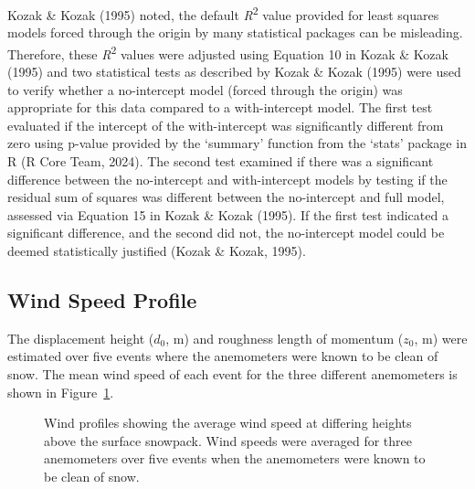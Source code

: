 \documentclass[
  letterpaper,
  DIV=11,
  numbers=noendperiod]{scrartcl}
\begin{document}
Kozak \& Kozak (1995) noted, the default \emph{R}\textsuperscript{2}
value provided for least squares models forced through the origin by
many statistical packages can be misleading. Therefore, these
\emph{R}\textsuperscript{2} values were adjusted using Equation 10 in
Kozak \& Kozak (1995) and two statistical tests as described by Kozak \&
Kozak (1995) were used to verify whether a no-intercept model (forced
through the origin) was appropriate for this data compared to a
with-intercept model. The first test evaluated if the intercept of the
with-intercept was significantly different from zero using p-value
provided by the `summary' function from the `stats' package in R (R Core
Team, 2024). The second test examined if there was a significant
difference between the no-intercept and with-intercept models by testing
if the residual sum of squares was different between the no-intercept
and full model, assessed via Equation 15 in Kozak \& Kozak (1995). If
the first test indicated a significant difference, and the second did
not, the no-intercept model could be deemed statistically justified
(Kozak \& Kozak, 1995).

\subsection{Wind Speed Profile}\label{wind-speed-profile}

The displacement height (\(d_0\), m) and roughness length of momentum
(\(z_0\), m) were estimated over five events where the anemometers were
known to be clean of snow. The mean wind speed of each event for the
three different anemometers is shown in Figure~\ref{fig-ws-events}.

\begin{figure}[H]


\caption{\label{fig-ws-events}Wind profiles showing the average wind
speed at differing heights above the surface snowpack. Wind speeds were
averaged for three anemometers over five events when the anemometers
were known to be clean of snow.}

\end{figure}%
\end{document}
